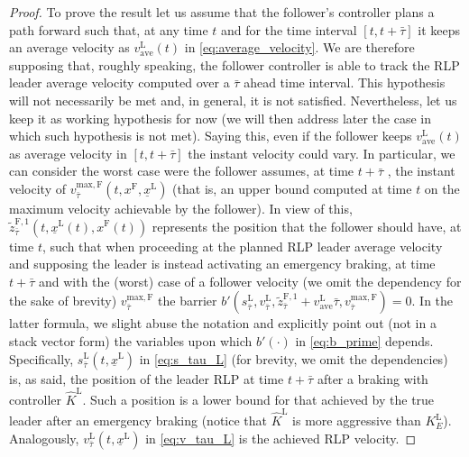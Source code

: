 \begin{proof}
	To prove the result let us assume that the follower's controller plans a path forward such that, at any time $t$ and for the time interval $[t, t+\bar{\tau}]$ it keeps an average velocity as $v_{\mathrm{ave}}^\mathrm{L}(t)$ in  \eqref{eq:average_velocity}.
	We are therefore supposing that, roughly speaking, the follower controller is able to track the RLP leader average velocity  computed over a $\bar{\tau}$ ahead time interval. This hypothesis will not necessarily be met and, in general, it is not satisfied. Nevertheless, let us keep it as working hypothesis for now (we will then address later the case in which such hypothesis is not met).
	Saying this, even if the follower keeps $v_{\mathrm{ave}}^\mathrm{L}(t)$ as average velocity in $[t, t+\bar{\tau}]$ the instant velocity could vary. In particular, we can consider the worst case were the follower assumes, at time $t+\bar{\tau}$ , the instant velocity of $v_{\bar{\tau}}^{\mathrm{max}, \mathrm{F}}(t, x^\mathrm{F}, \underline{x}^\mathrm{L})$ (that is, an upper bound computed at time $t$ on the maximum velocity achievable by the follower).
	In view of this, $\tilde{z}^{\mathrm{F},1}_{\bar{\tau}} (t,\underline{x}^\mathrm{L}(t),x^\mathrm{F}(t))$ represents the position that the follower should have, at time $t$, such that when proceeding at the planned RLP leader average velocity and supposing the leader is instead activating an emergency braking, at time $t+\bar{\tau}$ and with the (worst) case of a follower velocity (we omit the dependency for the sake of brevity) $v_{\bar{\tau}}^{\mathrm{max}, \mathrm{F}}$ the barrier $b'(s_{\bar{\tau}}^\mathrm{L},v_{\bar{\tau}}^\mathrm{L},\tilde{z}^{\mathrm{F},1}_{\bar{\tau}}+v_{\mathrm{ave}}^\mathrm{L}\bar{\tau},v_{\bar{\tau}}^{\mathrm{max}, \mathrm{F}})=0$. In the latter formula, we slight abuse the notation and explicitly point out (not in a stack vector form) the variables upon which $b'(\cdot)$ in \eqref{eq:b_prime} depends. Specifically,  $s_{\bar{\tau}}^\mathrm{L}\left( t,\underline{x}^\mathrm{L} \right)$ in \eqref{eq:s_tau_L} (for brevity, we omit the dependencies) is, as said, the position of the leader RLP at time $t+\bar{\tau}$ after a braking with controller $\hat{K}^\mathrm{L}$. Such a position is a lower bound for that achieved by the true leader after an emergency braking (notice that $\hat{K}^\mathrm{L}$ is  more aggressive than $K^\mathrm{L}_E$). Analogously, $v_{\bar{\tau}}^\mathrm{L}\left( t,\underline{x}^\mathrm{L} \right)$  in \eqref{eq:v_tau_L} is the achieved RLP velocity. 
	

\end{proof}
